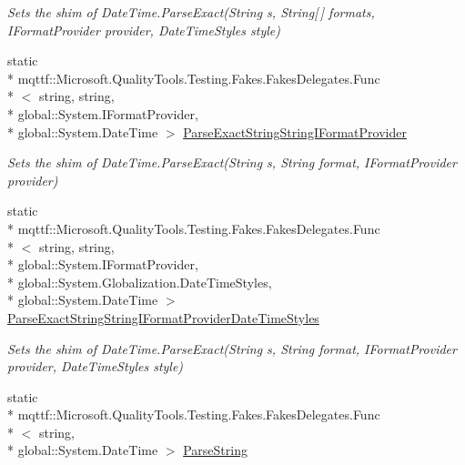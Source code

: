 \begin{DoxyCompactItemize}
\begin{DoxyCompactList}\small\item\em Sets the shim of Date\-Time.\-Parse\-Exact(\-String s, String\mbox{[}$\,$\mbox{]} formats, I\-Format\-Provider provider, Date\-Time\-Styles style)\end{DoxyCompactList}\item 
static \\*
mqttf\-::\-Microsoft.\-Quality\-Tools.\-Testing.\-Fakes.\-Fakes\-Delegates.\-Func\\*
$<$ string, string, \\*
global\-::\-System.\-I\-Format\-Provider, \\*
global\-::\-System.\-Date\-Time $>$ \hyperlink{class_system_1_1_fakes_1_1_shim_date_time_a646e5d45d08ac80797d17f6f78e2c936}{Parse\-Exact\-String\-String\-I\-Format\-Provider}
\begin{DoxyCompactList}\small\item\em Sets the shim of Date\-Time.\-Parse\-Exact(\-String s, String format, I\-Format\-Provider provider)\end{DoxyCompactList}\item 
static \\*
mqttf\-::\-Microsoft.\-Quality\-Tools.\-Testing.\-Fakes.\-Fakes\-Delegates.\-Func\\*
$<$ string, string, \\*
global\-::\-System.\-I\-Format\-Provider, \\*
global\-::\-System.\-Globalization.\-Date\-Time\-Styles, \\*
global\-::\-System.\-Date\-Time $>$ \hyperlink{class_system_1_1_fakes_1_1_shim_date_time_a3637a499fdc58f19ca8cedb684da3c5a}{Parse\-Exact\-String\-String\-I\-Format\-Provider\-Date\-Time\-Styles}
\begin{DoxyCompactList}\small\item\em Sets the shim of Date\-Time.\-Parse\-Exact(\-String s, String format, I\-Format\-Provider provider, Date\-Time\-Styles style)\end{DoxyCompactList}\item 
static \\*
mqttf\-::\-Microsoft.\-Quality\-Tools.\-Testing.\-Fakes.\-Fakes\-Delegates.\-Func\\*
$<$ string, \\*
global\-::\-System.\-Date\-Time $>$ \hyperlink{class_system_1_1_fakes_1_1_shim_date_time_ab9ef51dc091d59e7b3f94bed7a1d8ea5}{Parse\-String}

\end{DoxyCompactItemize}
